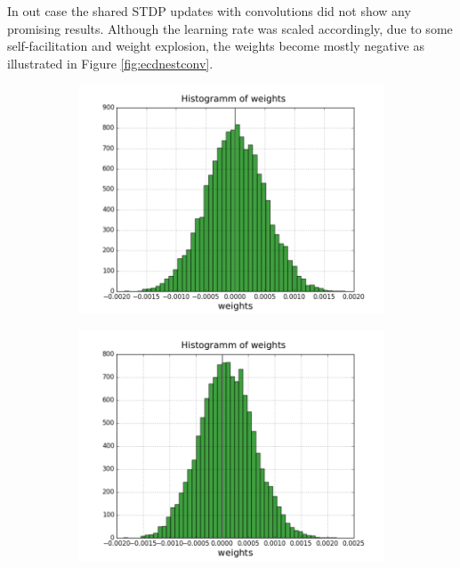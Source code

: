 In out case the shared STDP updates with convolutions did not show any promising results. Although the learning rate was scaled accordingly, due to some self-facilitation and weight explosion, the weights become mostly negative as illustrated in Figure \ref{fig:ecdnestconv}.


 \begin{figure}[h!]
	\centering
	\begin{subfigure}[t]{.24\textwidth}
  		\centering
  		\includegraphics[width=.9\linewidth]{imgs/app/nest/w_hist_conv1.png}
  		\caption{}
  		\label{fig:sub1}
	\end{subfigure}%
	\begin{subfigure}[t]{.24\textwidth}
  		\centering
  		\includegraphics[width=.9\linewidth]{imgs/app/nest/w_hist_conv2.png}
  		\caption{}
  		\label{fig:sub2}
	\end{subfigure}

\end{figure}

